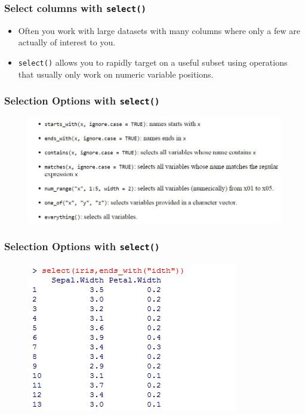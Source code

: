 \documentclass{beamer}
\begin{document}
	\begin{frame}
		\frametitle{Select columns with \texttt{select()}}
		\Large
		\vspace{-1cm}
		\begin{itemize}
			\item Often you work with large datasets with many columns where only a few are actually of interest to you. 
			\item \texttt{select()} allows you to rapidly target on a useful subset using operations that usually only work on numeric variable positions.
		\end{itemize}
	\end{frame}
	
	\begin{frame}
		\frametitle{Selection Options with \texttt{select()}}
		\begin{figure}
			\centering
			\includegraphics[width=01.25\linewidth]{images/selectoptions}
		\end{figure}
		
	\end{frame}
	\begin{frame}
		\frametitle{Selection Options with \texttt{select()}}
		
		\begin{figure}
			\centering
			\includegraphics[width=0.89\linewidth]{images/selectendswith}
		\end{figure}
		
	\end{frame}
	
\end{document}
